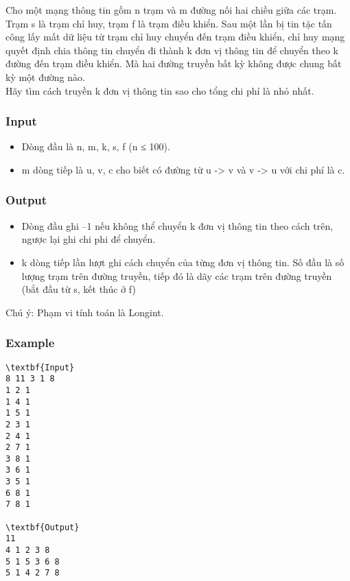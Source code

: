 

Cho một mạng thông tin gồm n trạm và m đường nối hai chiều giữa các trạm. Trạm s là trạm chỉ huy, trạm f là trạm điều khiển. Sau một lần bị tin tặc tấn công lấy mất dữ liệu từ trạm chỉ huy chuyển đến trạm điều khiển, chỉ huy mạng quyết định chia thông tin chuyển đi thành k đơn vị thông tin để chuyển theo k đường đến trạm điều khiển. Mà hai đường truyền bất kỳ không được chung bất kỳ một đường nào.
\\Hãy tìm cách truyền k đơn vị thông tin sao cho tổng chi phí là nhỏ nhất.

\subsubsection{Input}
\begin{itemize}
	\item Dòng đầu là n, m, k, s, f (n ≤ 100).
	\item m dòng tiếp là u, v, c cho biết có đường từ u -> v và v -> u với chi phí là c.
\end{itemize}

\subsubsection{Output}
\begin{itemize}
	\item Dòng đầu ghi –1 nếu không thể chuyển k đơn vị thông tin theo cách trên, ngược lại ghi chi phi để chuyển.
	\item k dòng tiếp lần lượt ghi cách chuyển của từng đơn vị thông tin. Số đầu là số lượng trạm trên đường truyền, tiếp đó là dãy các trạm trên đường truyền (bắt đầu từ s, kết thúc ở f)
\end{itemize}

Chú ý: Phạm vi tính toán là Longint.

\subsubsection{Example}
\begin{verbatim}
\textbf{Input}
8 11 3 1 8
1 2 1
1 4 1
1 5 1
2 3 1
2 4 1
2 7 1
3 8 1
3 6 1
3 5 1
6 8 1
7 8 1

\textbf{Output}
11
4 1 2 3 8
5 1 5 3 6 8
5 1 4 2 7 8

\end{verbatim}
